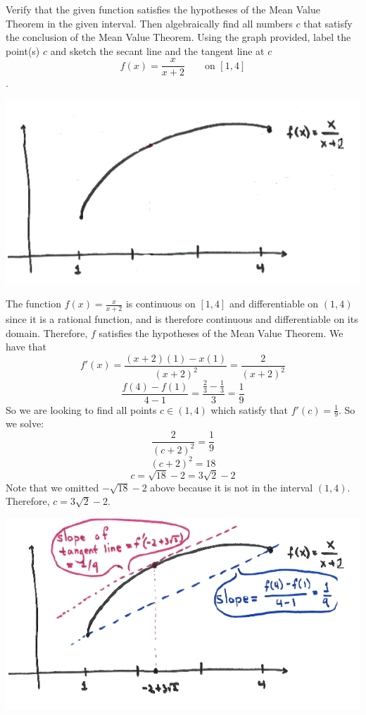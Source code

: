 \documentclass[nooutcomes,handout]{ximera}
\begin{document}
\begin{problem}
  Verify that the given function satisfies the hypotheses of the Mean Value Theorem in the given interval.
  Then algebraically find all numbers $c$ that satisfy the conclusion of the Mean Value Theorem.
  Using the graph provided, label the point(s) $c$ and sketch the secant line and the tangent line at $c$
  $$ f(x) = \frac{x}{x+2} \qquad \text{on } [1,4] $$.
  \begin{image}
    \includegraphics[scale=0.45]{Images/Figure3.png}
  \end{image}
  \begin{freeResponse}
    The function $f(x) = \frac{x}{x+2}$ is continuous on $[1,4]$ and differentiable on $(1,4)$ since it is a rational function, and is therefore continuous and differentiable on its domain.
    Therefore, $f$ satisfies the hypotheses of the Mean Value Theorem.
    We have that
    $$ f'(x) = \frac{(x+2)(1) - x(1)}{(x+2)^2} = \frac{2}{(x+2)^2} $$
    $$ \frac{f(4) - f(1)}{4-1} = \frac{\frac{2}{3} - \frac{1}{3}}{3} = \frac{1}{9} $$
    So we are looking to find all points $c \in (1,4)$ which satisfy that $ f'(c) = \frac{1}{9} $.  So we solve:
    $$ \frac{2}{(c+2)^2} = \frac{1}{9} $$
    $$ (c+2)^2 = 18 $$
    $$ c = \sqrt{18} - 2 = 3\sqrt{2} - 2 $$
    Note that we omitted $-\sqrt{18} - 2$ above because it is not in the interval $(1,4)$.  Therefore, $c = 3\sqrt{2} - 2$.
       \begin{image}
      \includegraphics[scale=0.45]{Images/Figure4.png}
    \end{image}
  \end{freeResponse}
\end{problem}
\end{document}
